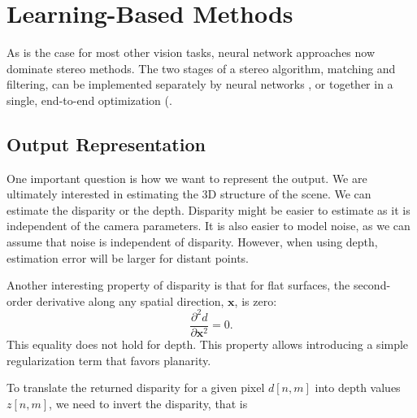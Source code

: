 





\section{Learning-Based Methods}

As is the case for most other vision tasks, neural network approaches now dominate stereo methods.  The two stages of a stereo algorithm, matching and filtering, can be implemented separately by neural networks \cite{Zbontar2015}, or together in a single, end-to-end optimization (\cite{Zhang2019GANet,Chang2018,Mayer2016,Kendall2017}.

\subsection{Output Representation}

One important question is how  we want to represent the output. We are ultimately interested in estimating the 3D structure of the scene. We can estimate the disparity or the depth. Disparity might be easier to estimate as it is independent of the camera parameters. It is also easier to model noise, as we can assume that noise is independent of disparity. However, when using depth, estimation error will be larger for distant points. 

Another interesting property of disparity is that for flat surfaces, the second-order derivative along any spatial direction, $\mathbf{x}$, is zero:
\begin{equation}
    \frac{\partial^2 d}{\partial \mathbf{x}^2}  = 0.
\end{equation}
 This equality does not hold for depth. This property allows introducing a simple regularization term that favors planarity.

To translate the returned disparity for a given pixel $d\left[n,m \right]$ into depth values $z\left[n,m \right]$, we need to invert the disparity, that is

